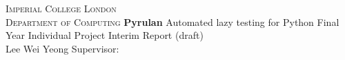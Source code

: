 
\begin{titlepage}
\begin{center}
\textsc{\Large Imperial College London\\Department of Computing}
\vfil
{\Huge{\textbf{Pyrulan}}}\linebreak \linebreak
{\huge Automated lazy testing for Python}
\vfil
{\LARGE Final Year Individual Project}\linebreak \linebreak
{\LARGE Interim Report (draft)}\\[2cm]
{\Large Lee Wei Yeong }
\vfil
{\Large Supervisor: \supervisor} \linebreak \linebreak
\vfil
{\Large \monthname\ \number\year}
\end{center}
\end{titlepage}
